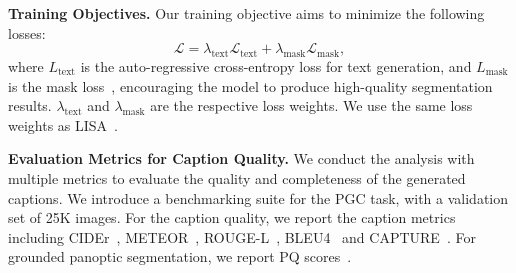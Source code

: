 \noindent\textbf{Training Objectives.} Our training objective aims to minimize the following losses:
\begin{equation}
    \mathcal{L} = \lambda_{\text{text}} \mathcal{L}_{\text{text}} + \lambda_{\text{mask}} \mathcal{L}_{\text{mask}},
\end{equation}
where $L_{\text{text}}$ is the auto-regressive cross-entropy loss for text generation, and $L_{\text{mask}}$ is the mask loss~\cite{wang2021max}, encouraging the model to produce high-quality segmentation results.
$\lambda_{\text{text}}$ and $\lambda_{\text{mask}}$ are the respective loss weights. We use the same loss weights as LISA~\cite{lai2024lisa}.



\noindent\textbf{Evaluation Metrics for Caption Quality.} We conduct the analysis with multiple metrics to evaluate the quality and completeness of the generated captions. We introduce a benchmarking suite for the PGC task, with a validation set of 25K images. For the caption quality, we report  the caption metrics including CIDEr~\cite{vedantam2015cider}, METEOR~\cite{banerjee2005meteor}, ROUGE-L~\cite{lin2004rouge}, BLEU4~\cite{papineni2002bleu} and CAPTURE~\cite{dong2024capture}. For grounded panoptic segmentation, we report PQ scores~\cite{kirillov2019panoptic}.

